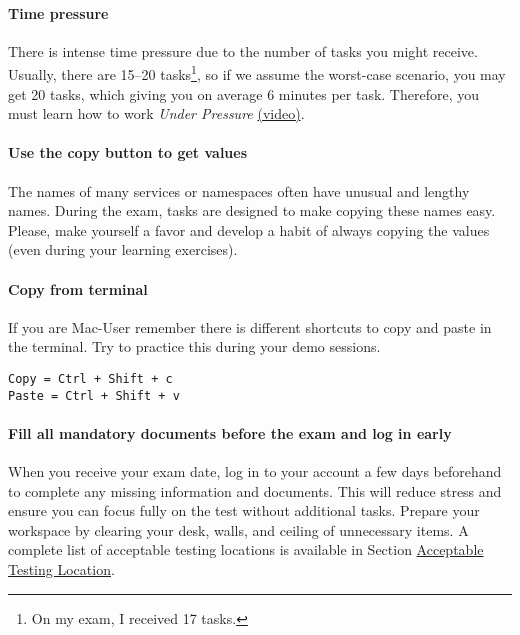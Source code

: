 \paragraph{Time pressure} There is intense time pressure due to the number of tasks you might receive. Usually, there are 15–20 tasks\footnote{On my exam, I received 17 tasks.}, so if we assume the worst-case scenario, you may get 20 tasks, which giving you on average 6 minutes per task. Therefore, you must learn how to work \textit{Under Pressure} \href{https://www.youtube.com/watch?v=a01QQZyl-_I}{(video)}.

\paragraph{Use the copy button to get values}

The names of many services or namespaces often have unusual and lengthy names. During the exam, tasks are designed to make copying these names easy. Please, make yourself a favor and develop a habit of always copying the values (even during your learning exercises).

\paragraph{Copy from terminal} If you are Mac-User remember there is different shortcuts to copy and paste in the terminal. Try to practice this during your demo sessions.

\begin{lstlisting}[label=lst:exam-copy-and-paste, caption=Copy and paste in exam environment]
Copy = Ctrl + Shift + c
Paste = Ctrl + Shift + v
\end{lstlisting}

\paragraph{Fill all mandatory documents before the exam and log in early}  
When you receive your exam date, log in to your account a few days beforehand to complete any missing information and documents. This will reduce stress and ensure you can focus fully on the test without additional tasks. Prepare your workspace by clearing your desk, walls, and ceiling of unnecessary items. A complete list of acceptable testing locations is available in Section \href{https://docs.linuxfoundation.org/tc-docs/certification/tips-cka-and-ckad#acceptable-testing-location}{Acceptable Testing Location}\cite{linuxfoundation-important-instructions-cka-and-ckad}.

